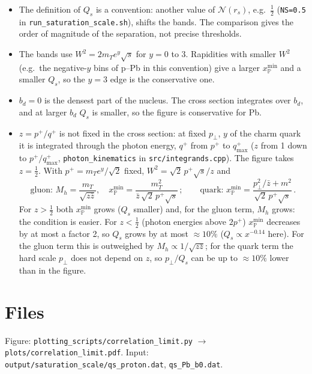 \documentclass[12pt]{article}
\newcommand{\xpo}{x_{\mathbb{P}}}
\begin{document}
\begin{itemize}
\item The definition of $Q_s$ is a convention: another value of $\mathcal{N}(r_s)$, e.g.\ $\tfrac12$
  (\texttt{NS=0.5} in \texttt{run\_saturation\_scale.sh}), shifts the bands. The comparison gives the
  order of magnitude of the separation, not precise thresholds.
\item The bands use $W^2=2m_Te^{y}\sqrt{s}$ for $y=0$ to 3. Rapidities with smaller $W^2$ (e.g.\ the
  negative-$y$ bins of p--Pb in this convention) give a larger $\xpo^{\min}$ and a smaller $Q_s$, so the
  $y=3$ edge is the conservative one.
\item $b_d=0$ is the densest part of the nucleus. The cross section integrates over $b_d$, and at
  larger $b_d$ $Q_s$ is smaller, so the figure is conservative for Pb.
\item $z=p^+/q^+$ is not fixed in the cross section: at fixed $p_\perp$, $y$ of the charm quark it is
  integrated through the photon energy, $q^+$ from $p^+$ to $q^+_{\max}$ ($z$ from 1 down to
  $p^+/q^+_{\max}$, \texttt{photon\_kinematics} in \texttt{src/integrands.cpp}). The figure takes $z=\tfrac12$.
  With $p^+=m_Te^y/\sqrt2$ fixed, $W^2=\sqrt2\,p^+\sqrt{s}/z$ and
  \begin{equation*}
  \text{gluon: } M_h=\frac{m_T}{\sqrt{z\bar z}},\quad \xpo^{\min}=\frac{m_T^2}{\bar z\,\sqrt2\,p^+\sqrt{s}}\,;\qquad
  \text{quark: } \xpo^{\min}=\frac{p_\perp^2/\bar z+m^2}{\sqrt2\,p^+\sqrt{s}}\,.
  \end{equation*}
  For $z>\tfrac12$ both $\xpo^{\min}$ grows ($Q_s$ smaller) and, for the gluon term, $M_h$ grows: the
  condition is easier. For $z<\tfrac12$ (photon energies above $2p^+$) $\xpo^{\min}$ decreases by at most
  a factor 2, so $Q_s$ grows by at most $\approx10\%$ ($Q_s\propto x^{-0.14}$ here). For the gluon term
  this is outweighed by $M_h\propto1/\sqrt{z\bar z}$; for the quark term the hard scale $p_\perp$ does not
  depend on $z$, so $p_\perp/Q_s$ can be up to $\approx10\%$ lower than in the figure.
\end{itemize}

\section*{Files}
Figure: \texttt{plotting\_scripts/correlation\_limit.py} $\to$ \texttt{plots/correlation\_limit.pdf}.
Input: \texttt{output/saturation\_scale/qs\_proton.dat}, \texttt{qs\_Pb\_b0.dat}.
\end{document}
